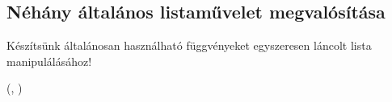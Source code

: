 \documentclass[usenames,dvipsnames,aspectratio=169]{beamer}
\begin{document}







\subsection{Néhány általános listaművelet megvalósítása}
\begin{frame}
  Készítsünk általánosan használható függvényeket egyszeresen láncolt lista manipulálásához!
  \scriptsize
  \begin{exampleblock}{ (, %
  )}
    \vspace{-0.2cm}
    
    \vspace{-0.2cm}
  \end{exampleblock}
\end{frame}





\end{document}
